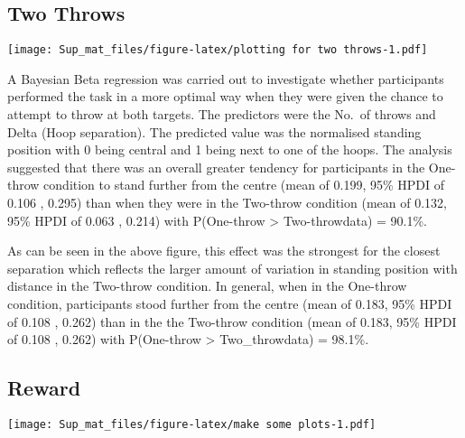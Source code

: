 \documentclass[
]{article}
\begin{document}
\hypertarget{two-throws}{%
\subsection{Two Throws}\label{two-throws}}

\texttt{[image: Sup\_mat\_files/figure-latex/plotting for two throws-1.pdf]}

A Bayesian Beta regression was carried out to investigate whether participants performed the task in a more optimal way when they were given the chance to attempt to throw at both targets. The predictors were the No.~of throws and Delta (Hoop separation). The predicted value was the normalised standing position with 0 being central and 1 being next to one of the hoops.
The analysis suggested that there was an overall greater tendency for participants in the One-throw condition to stand further from the centre (mean of 0.199, 95\% HPDI of \textbar{}0.106 , 0.295\textbar{}) than when they were in the Two-throw condition (mean of 0.132, 95\% HPDI of \textbar{}0.063 , 0.214\textbar{}) with P(One-throw \textgreater{} Two-throw\textbar{}data) = 90.1\%.

As can be seen in the above figure, this effect was the strongest for the closest separation which reflects the larger amount of variation in standing position with distance in the Two-throw condition. In general, when in the One-throw condition, participants stood further from the centre (mean of 0.183, 95\% HPDI of \textbar{}0.108 , 0.262\textbar{}) than in the the Two-throw condition (mean of 0.183, 95\% HPDI of \textbar{}0.108 , 0.262\textbar{}) with P(One-throw \textgreater{} Two\_throw\textbar{}data) = 98.1\%.

\hypertarget{reward}{%
\subsection{Reward}\label{reward}}

\texttt{[image: Sup\_mat\_files/figure-latex/make some plots-1.pdf]}
\end{document}
